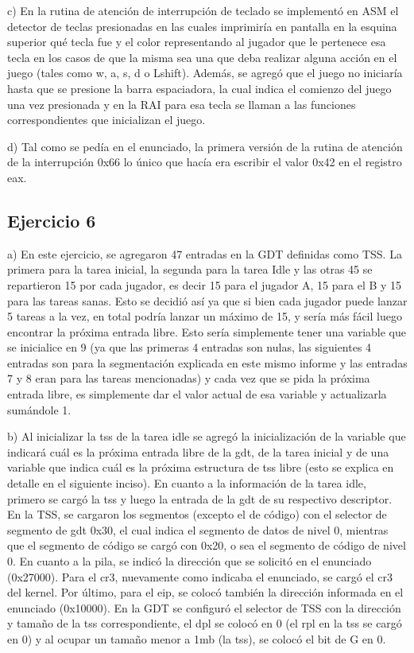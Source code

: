 \documentclass[a4paper]{article}
\begin{document}
c) En la rutina de atención de interrupción de teclado se implementó en ASM el detector de teclas presionadas en las cuales imprimiría en pantalla en la esquina
superior qué tecla fue y el color representando al jugador que le pertenece esa tecla en los casos de que la misma sea una que deba realizar alguna acción en el juego
(tales como w, a, s, d o Lshift). Además, se agregó que el juego no iniciaría hasta que se presione la barra espaciadora, la cual indica el comienzo del juego una vez presionada
y en la RAI para esa tecla se llaman a las funciones correspondientes que inicializan el juego.

d) Tal como se pedía en el enunciado, la primera versión de la rutina de atención de la interrupción 0x66 lo único que hacía era escribir el valor 0x42 en el registro eax.


\subsection{Ejercicio 6}

a) En este ejercicio, se agregaron 47 entradas en la GDT definidas como TSS. La primera para la tarea inicial,
la segunda para la tarea Idle y las otras 45 se repartieron 15 por cada jugador, es decir 15 para el jugador A,
15 para el B y 15 para las tareas sanas. Esto se decidió así ya que si bien cada jugador puede lanzar 5 tareas
a la vez, en total podría lanzar un máximo de 15, y sería más fácil luego encontrar la próxima entrada libre.
Esto sería simplemente tener una variable que se inicialice en 9 (ya que las primeras 4 entradas son nulas, las siguientes
 4 entradas son para la segmentación explicada en este mismo informe y las entradas 7 y 8 eran para las tareas mencionadas)
y cada vez que se pida la próxima entrada libre, es simplemente dar el valor actual de esa variable y actualizarla sumándole 1.

b) Al inicializar la tss de la tarea idle se agregó la inicialización de la variable que indicará cuál es la próxima entrada libre de la gdt, de la tarea inicial y
de una variable que indica cuál es la próxima estructura de tss libre (esto se explica en detalle en el siguiente inciso).
En cuanto a la información de la tarea idle, primero se cargó la tss y luego la entrada de la gdt de su respectivo descriptor.
En la TSS, se cargaron los segmentos (excepto el de código) con el selector de segmento de gdt 0x30, el cual indica el segmento de datos de nivel 0, mientras que el
segmento de código se cargó con 0x20, o sea el segmento de código de nivel 0. En cuanto a la pila, se indicó la dirección que se solicitó en el enunciado (0x27000).
Para el cr3, nuevamente como indicaba el enunciado, se cargó el cr3 del kernel. Por último, para el eip, se colocó también la dirección informada en el enunciado (0x10000).
En la GDT se configuró el selector de TSS con la dirección y tamaño de la tss correspondiente, el dpl se colocó en 0 (el rpl en la tss se cargó en 0) y al ocupar
un tamaño menor a 1mb (la tss), se colocó el bit de G en 0.
\end{document}
